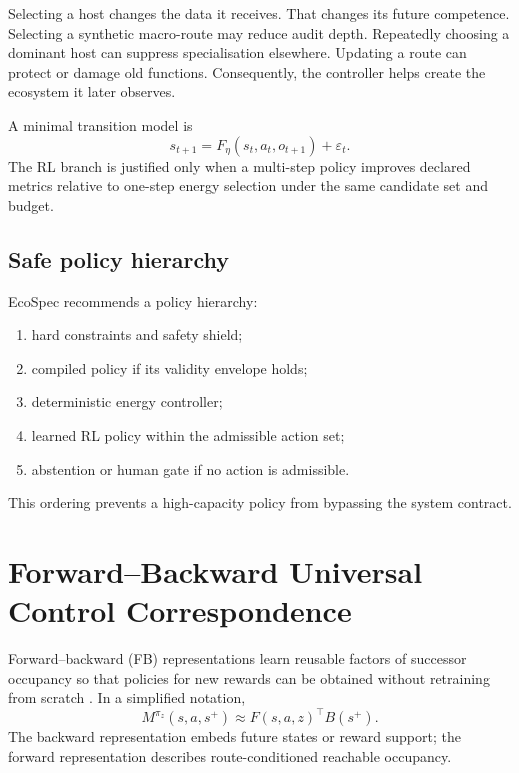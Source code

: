 \documentclass[10pt]{article}
\begin{document}
Selecting a host changes the data it receives. That changes its future competence. Selecting a synthetic macro-route may reduce audit depth. Repeatedly choosing a dominant host can suppress specialisation elsewhere. Updating a route can protect or damage old functions. Consequently, the controller helps create the ecosystem it later observes.

A minimal transition model is
\begin{equation}
  s_{t+1}=F_\eta(s_t,a_t,o_{t+1})+\varepsilon_t.
\end{equation}
The RL branch is justified only when a multi-step policy improves declared metrics relative to one-step energy selection under the same candidate set and budget.

\subsection{Safe policy hierarchy}

EcoSpec recommends a policy hierarchy:
\begin{enumerate}
  \item hard constraints and safety shield;
  \item compiled policy if its validity envelope holds;
  \item deterministic energy controller;
  \item learned RL policy within the admissible action set;
  \item abstention or human gate if no action is admissible.
\end{enumerate}
This ordering prevents a high-capacity policy from bypassing the system contract.

\section{Forward--Backward Universal Control Correspondence}

Forward--backward (FB) representations learn reusable factors of successor occupancy so that policies for new rewards can be obtained without retraining from scratch \citep{touati2021learning,touati2022zeroshot}. In a simplified notation,
\begin{equation}
  M^{\pi_z}(s,a,s^+)\approx F(s,a,z)^\top B(s^+).
  \label{eq:fb}
\end{equation}
The backward representation embeds future states or reward support; the forward representation describes route-conditioned reachable occupancy.
\end{document}
